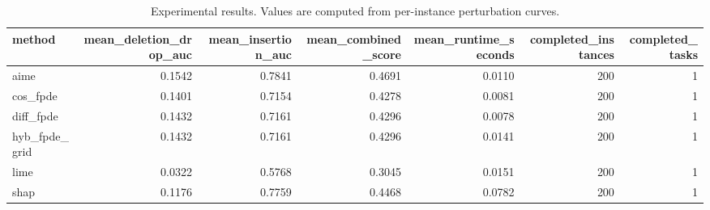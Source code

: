 \begin{table}[t]
\caption{Experimental results. Values are computed from per-instance perturbation curves.}
\label{tab:main_results_computed}
\centering
\begin{tabular}{lrrrrrr}
\toprule
method & mean\_deletion\_drop\_auc & mean\_insertion\_auc & mean\_combined\_score & mean\_runtime\_seconds & completed\_instances & completed\_tasks \\
\midrule
aime & 0.1542 & 0.7841 & 0.4691 & 0.0110 & 200 & 1 \\
cos\_fpde & 0.1401 & 0.7154 & 0.4278 & 0.0081 & 200 & 1 \\
diff\_fpde & 0.1432 & 0.7161 & 0.4296 & 0.0078 & 200 & 1 \\
hyb\_fpde\_grid & 0.1432 & 0.7161 & 0.4296 & 0.0141 & 200 & 1 \\
lime & 0.0322 & 0.5768 & 0.3045 & 0.0151 & 200 & 1 \\
shap & 0.1176 & 0.7759 & 0.4468 & 0.0782 & 200 & 1 \\
\bottomrule
\end{tabular}

\end{table}
